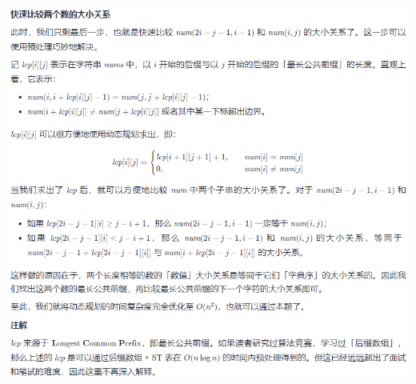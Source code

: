 \documentclass[9pt, b5paaper]{book}
\begin{document}
\begin{enumerate}
\includegraphics[width=.9\linewidth]{./pic/1977-3.png}


\end{enumerate}
\end{document}
